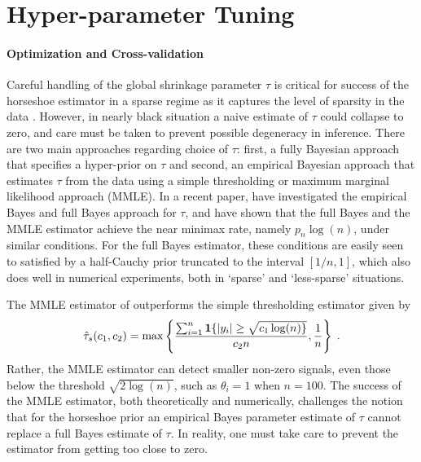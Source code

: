 \documentclass[11pt]{article}
\begin{document}

\section{Hyper-parameter Tuning}

\paragraph{Optimization and Cross-validation}

Careful handling of the global shrinkage parameter $\tau$ is critical for
success of the horseshoe estimator in a sparse regime as it captures the level
of sparsity in the data \citep{carvalho2010horseshoe, datta2013asymptotic,
van2015conditions, van2016many}. However, in nearly black situation a naive
estimate of $\tau$ could collapse to zero, and care must be taken to prevent
possible degeneracy in inference. There are two main approaches regarding
choice of $\tau$: first, a fully Bayesian approach that specifies a hyper-prior
on $\tau$ and second, an empirical Bayesian approach that estimates $\tau$ from
the data using a simple thresholding or maximum marginal likelihood approach
(MMLE). In a recent paper, \citet{van2017adaptive} have investigated the
empirical Bayes and full Bayes approach for $\tau$, and have shown that the
full Bayes and the MMLE estimator achieve the near minimax rate, namely $p_n
\log(n)$, under similar conditions. For the full Bayes estimator, these
conditions are easily seen to satisfied by a half-Cauchy prior truncated to the
interval $[1/n,1]$, which also does well in numerical experiments, both in
`sparse' and `less-sparse' situations. 

The MMLE estimator of \citet{van2017adaptive} outperforms the simple
thresholding estimator given by
\[
  \hat{\tau}_s(c_1, c_2) = \max \left \{ \frac{\sum_{i=1}^{n} {\bf 1} \{ \lvert y_i\rvert \ge
  \sqrt{c_1 \log(n) \}}}{c_2 n}, \frac{1}{n} \right\}
  \;.
\]
Rather, the MMLE estimator can detect smaller non-zero signals, even those below the threshold $\sqrt{2 \log(n)}$, such as $\theta_i = 1$ when $n = 100$. 
The success of the MMLE estimator, both theoretically and numerically,
challenges the notion that for the horseshoe prior an empirical Bayes parameter
estimate of $\tau$ cannot replace a full Bayes estimate of $\tau$. In reality,
one must take care to prevent the estimator from getting too close to zero. 
\end{document}
